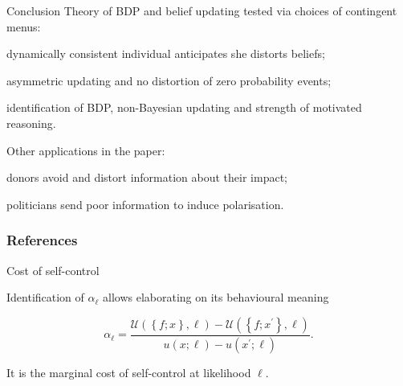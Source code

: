 \documentclass[usenames,dvipsnames,aspectratio=169,11pt,handout]{beamer}
\begin{document}
\begin{frame}{Conclusion}
	Theory of BDP and belief updating tested via choices of contingent menus:
	\vfill

	\begin{wideitemize}
		\item dynamically consistent individual anticipates she distorts beliefs;
		\item asymmetric updating and no distortion of zero probability events;
		\item identification of BDP, non-Bayesian updating and strength of motivated reasoning.
	\end{wideitemize}

	\vfill

	Other applications in the paper:

	\vfill

	\begin{wideitemize}
		\item donors avoid and distort information about their impact;
		\item politicians send poor information to induce polarisation.
	\end{wideitemize}

\end{frame}

\begin{frame}

	\frametitle{References}

	
	


\end{frame}

\appendix

\begin{frame}{Cost of self-control}\label{alpha}

	Identification of \( \alpha_{\ell} \) allows elaborating on its behavioural meaning

	\vfill

	\[
		\alpha_{\ell} = \frac{\mathcal{U} \left( \left\{f; x \right\}, \ell \right) - \mathcal{U} \left( \left\{f; x^{\prime} \right\}, \ell \right) }{u \left( x ; \ell \right) - u \left( x^{\prime} ; \ell \right)} .
	\]

	\vfill

	It is the marginal cost of self-control at likelihood \( \ell \). \hyperlink{fullmodel}{}

\end{frame}
\end{document}
